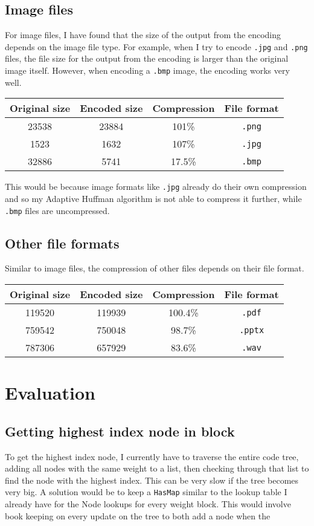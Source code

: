 \documentclass{article}
\newcommand{\tablerow}[4]{ #1 & #2 & #3 & #4\\}
\newcommand{\n}[0]{\newline}
\begin{document}
\subsection{Image files}
For image files, I have found that the size of the output from the encoding depends on the image file type. For example, when I try to encode \texttt{.jpg} and \texttt{.png} files, the file size for the output from the encoding is larger than the original image itself. However, when encoding a \texttt{.bmp} image, the encoding works very well.

\begin{center}
\begin{tabular}{ |c|c|c|c| }
\hline
Original size & Encoded size & Compression & File format \\
\hline
\tablerow{23538}{23884}{101\%}{\texttt{.png}}
\tablerow{1523}{1632}{107\%}{\texttt{.jpg}}
\tablerow{32886}{5741}{17.5\%}{\texttt{.bmp}}
\hline
\end{tabular}
\end{center}
This would be because image formats like \texttt{.jpg} already do their own compression and so my Adaptive Huffman algorithm is not able to compress it further, while \texttt{.bmp} files are uncompressed. 

\subsection{Other file formats}
Similar to image files, the compression of other files depends on their file format. 
\begin{center}
\begin{tabular}{ |c|c|c|c| }
\hline
Original size & Encoded size & Compression & File format \\
\hline
\tablerow{119520}{119939}{100.4\%}{\texttt{.pdf}}
\tablerow{759542}{750048}{98.7\%}{\texttt{.pptx}}
\tablerow{787306}{657929}{83.6\%}{\texttt{.wav}}
\hline
\end{tabular}
\end{center}

\section{Evaluation}
\subsection{Getting highest index node in block}
To get the highest index node, I currently have to traverse the entire code tree, adding all nodes with the same weight to a list, then checking through that list to find the node with the highest index. This can be very slow if the tree becomes very big. \n A solution would be to keep a \texttt{HasMap} similar to the lookup table I already have for the Node lookups for every weight block. This would involve book keeping on every update on the tree to both add a node when the 
\end{document}
